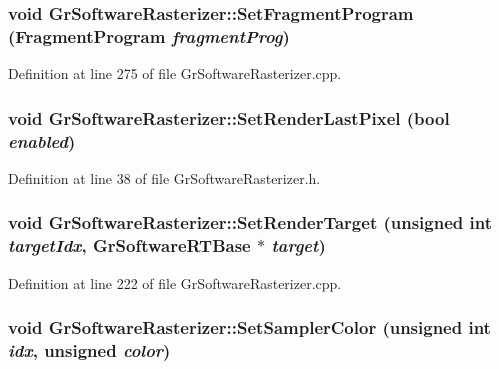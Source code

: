 \begin{CompactItemize}
{\subsubsection[{SetFragmentProgram}]{\setlength{\rightskip}{0pt plus 5cm}void GrSoftwareRasterizer::SetFragmentProgram ({\bf FragmentProgram} {\em fragmentProg})}}
\label{class_gr_software_rasterizer_660384a042b72d1f2e1235a938acc23b}




Definition at line 275 of file GrSoftwareRasterizer.cpp.\hypertarget{class_gr_software_rasterizer_e00f004845e02489d39864fbfb306435}{
\subsubsection[{SetRenderLastPixel}]{\setlength{\rightskip}{0pt plus 5cm}void GrSoftwareRasterizer::SetRenderLastPixel (bool {\em enabled})}}
\label{class_gr_software_rasterizer_e00f004845e02489d39864fbfb306435}




Definition at line 38 of file GrSoftwareRasterizer.h.\hypertarget{class_gr_software_rasterizer_a5d85f57b17b61072eaf05f6f6d56f98}{
\subsubsection[{SetRenderTarget}]{\setlength{\rightskip}{0pt plus 5cm}void GrSoftwareRasterizer::SetRenderTarget (unsigned int {\em targetIdx}, \/  {\bf GrSoftwareRTBase} $\ast$ {\em target})}}
\label{class_gr_software_rasterizer_a5d85f57b17b61072eaf05f6f6d56f98}




Definition at line 222 of file GrSoftwareRasterizer.cpp.\hypertarget{class_gr_software_rasterizer_e7b4972331ce39e47a82e4c9c19b584f}{
\subsubsection[{SetSamplerColor}]{\setlength{\rightskip}{0pt plus 5cm}void GrSoftwareRasterizer::SetSamplerColor (unsigned int {\em idx}, \/  unsigned {\em color})}}
\label{class_gr_software_rasterizer_e7b4972331ce39e47a82e4c9c19b584f}





\end{CompactItemize}
